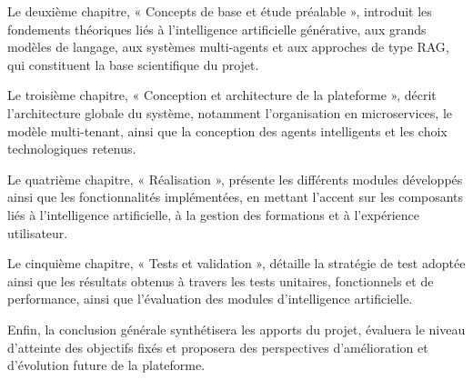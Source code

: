 Le deuxième chapitre, « Concepts de base et étude préalable », introduit les fondements théoriques liés à l'intelligence artificielle générative, aux grands modèles de langage, aux systèmes multi-agents et aux approches de type RAG, qui constituent la base scientifique du projet.

Le troisième chapitre, « Conception et architecture de la plateforme », décrit l'architecture globale du système, notamment l'organisation en microservices, le modèle multi-tenant, ainsi que la conception des agents intelligents et les choix technologiques retenus.

Le quatrième chapitre, « Réalisation », présente les différents modules développés ainsi que les fonctionnalités implémentées, en mettant l'accent sur les composants liés à l'intelligence artificielle, à la gestion des formations et à l'expérience utilisateur.

Le cinquième chapitre, « Tests et validation », détaille la stratégie de test adoptée ainsi que les résultats obtenus à travers les tests unitaires, fonctionnels et de performance, ainsi que l'évaluation des modules d'intelligence artificielle.

Enfin, la conclusion générale synthétisera les apports du projet, évaluera le niveau d'atteinte des objectifs fixés et proposera des perspectives d'amélioration et d'évolution future de la plateforme.
